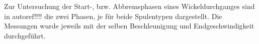 


Zur Untersuchung der Start-, bzw. Abbremsphasen eines Wickeldurchganges sind in autoref{}!!!! die zwei Phasen, je für beide Spulentypen dargestellt. Die Messungen wurde jeweils mit der selben Beschleunigung und Endgeschwindigkeit durchgeführt.









